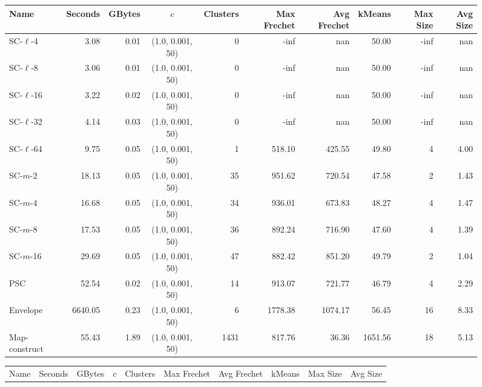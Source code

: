 \clearpage
\newpage 
%
\clearpage
\begin{figure} \begin{center}
    \begin{minipage}{\textwidth}
    {
    \begin{tabular}{@{}lrrcrrrrrr@{}}
        \toprule
        Name & Seconds & GBytes & $c$ & Clusters & Max Frechet & Avg Frechet & kMeans & Max Size & Avg Size\\
        \midrule
        SC-$\ell$-4 & 3.08 & 0.01 & (1.0, 0.001, 50) & 0 & -inf & nan & 50.00 & -inf & nan\\
        SC-$\ell$-8 & 3.06 & 0.01 & (1.0, 0.001, 50) & 0 & -inf & nan & 50.00 & -inf & nan\\
        SC-$\ell$-16 & 3.22 & 0.02 & (1.0, 0.001, 50) & 0 & -inf & nan & 50.00 & -inf & nan\\
        SC-$\ell$-32 & 4.14 & 0.03 & (1.0, 0.001, 50) & 0 & -inf & nan & 50.00 & -inf & nan\\
        SC-$\ell$-64 & 9.75 & 0.05 & (1.0, 0.001, 50) & 1 & 518.10 & 425.55 & 49.80 & 4 & 4.00\\
        SC-$m$-2 & 18.13 & 0.05 & (1.0, 0.001, 50) & 35 & 951.62 & 720.54 & 47.58 & 2 & 1.43\\
        SC-$m$-4 & 16.68 & 0.05 & (1.0, 0.001, 50) & 34 & 936.01 & 673.83 & 48.27 & 4 & 1.47\\
        SC-$m$-8 & 17.53 & 0.05 & (1.0, 0.001, 50) & 36 & 892.24 & 716.90 & 47.60 & 4 & 1.39\\
        SC-$m$-16 & 29.69 & 0.05 & (1.0, 0.001, 50) & 47 & 882.42 & 851.20 & 49.79 & 2 & 1.04\\
        PSC & 52.54 & 0.02 & (1.0, 0.001, 50) & 14 & 913.07 & 721.77 & 46.79 & 4 & 2.29\\
        Envelope & 6640.05 & 0.23 & (1.0, 0.001, 50) & 6 & 1778.38 & 1074.17 & 56.45 & 16 & 8.33\\
        Map-construct & 55.43 & 1.89 & (1.0, 0.001, 50) & 1431 & 817.76 & 36.36 & 1651.56 & 18 & 5.13\\
        \bottomrule
    \end{tabular}
    }
    {
    \begin{tabular}{@{}lrrcrrrrrr@{}}
        \toprule
        Name & Seconds & GBytes & $c$ & Clusters & Max Frechet & Avg Frechet & kMeans & Max Size & Avg Size\\

\end{tabular}}
\end{minipage}
\end{center}
\end{figure}
